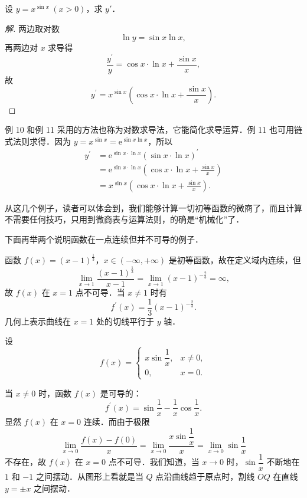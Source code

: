 \begin{example}\label{ex:4-1-11}
设 $y = x^{\sin x}\ (x > 0)$，求 $y'$．
\end{example}

\begin{proof}[解]
两边取对数
\[
\ln y = \sin x\ln x,
\]
再两边对 $x$ 求导得
\[
\frac{y^{\prime}}{y} = \cos x\cdot\ln x + \frac{\sin x}{x},
\]
故
\[
y^{\prime} = x^{\sin x}\left(\cos x\cdot\ln x + \frac{\sin x}{x}\right).
\]
\end{proof}

例 10 和例 11 采用的方法也称为对数求导法，它能简化求导运算．例 11 也可用链式法则求得．因为 $y = x^{\sin x} = \mathrm{e}^{\sin x\ln x}$，所以
\[
\begin{aligned}
y^{\prime} &= \mathrm{e}^{\sin x\cdot\ln x}\left(\sin x\cdot\ln x\right)^{\prime}\\
&= \mathrm{e}^{\sin x\cdot\ln x}\left(\cos x\cdot\ln x + \frac{\sin x}{x}\right)\\
&= x^{\sin x}\left(\cos x\cdot\ln x + \frac{\sin x}{x}\right).
\end{aligned}
\]

从这几个例子，读者可以体会到，我们能够计算一切初等函数的微商了，而且计算不需要任何技巧，只用到微商表与运算法则，的确是``机械化''了．

下面再举两个说明函数在一点连续但并不可导的例子．

\begin{example}\label{ex:4-1-12}
函数 $f(x) = (x-1)^{\frac{1}{3}}$，$x\in(-\infty,+\infty)$ 是初等函数，故在定义域内连续，但
\[
\lim_{x\to 1}\frac{(x-1)^{\frac{1}{3}}}{x-1} = \lim_{x\to 1}\left(x-1\right)^{-\frac{2}{3}} = \infty,
\]
故 $f(x)$ 在 $x = 1$ 点不可导．当 $x \neq 1$ 时有
\[
f^{\prime}\left(x\right) = \frac{1}{3}\left(x-1\right)^{-\frac{2}{3}}.
\]
几何上表示曲线在 $x = 1$ 处的切线平行于 $y$ 轴．
\end{example}

\begin{example}\label{ex:4-1-13}
设
\[
f(x) = \begin{cases}
x\sin\dfrac{1}{x}, & x \neq 0,\\
0, & x = 0.
\end{cases}
\]
\end{example}

当 $x \neq 0$ 时，函数 $f(x)$ 是可导的：
\[
f^{\prime}\left(x\right) = \sin\frac{1}{x} - \frac{1}{x}\cos\frac{1}{x}.
\]
显然 $f(x)$ 在 $x = 0$ 连续．而由于极限
\[
\lim_{x\to 0}\frac{f(x) - f(0)}{x} = \lim_{x\to 0}\frac{x\sin\dfrac{1}{x}}{x} = \lim_{x\to 0}\sin\frac{1}{x}
\]
不存在，故 $f(x)$ 在 $x = 0$ 点不可导．我们知道，当 $x \to 0$ 时，$\sin\dfrac{1}{x}$ 不断地在 $1$ 和 $-1$ 之间摆动．从图形上看就是当 $Q$ 点沿曲线趋于原点时，割线 $OQ$ 在直线 $y = \pm x$ 之间摆动．

